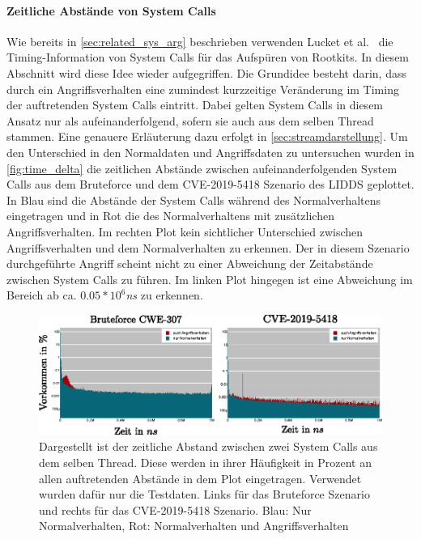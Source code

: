             \paragraph{Zeitliche Abstände von System Calls}

                Wie bereits in \autoref{sec:related_sys_arg} beschrieben verwenden Lucket et al.~\cite{TIMINGLUCKETT2016} die Timing-Information von System Calls für das Aufspüren von Rootkits.
                In diesem Abschnitt wird diese Idee wieder aufgegriffen.
                Die Grundidee besteht darin, dass durch ein Angriffsverhalten eine zumindest kurzzeitige Veränderung im Timing der auftretenden System Calls eintritt.
                Dabei gelten System Calls in diesem Ansatz nur als aufeinanderfolgend, sofern sie auch aus dem selben Thread stammen.
                Eine genauere Erläuterung dazu erfolgt in \autoref{sec:streamdarstellung}.
                Um den Unterschied in den Normaldaten und Angriffsdaten zu untersuchen wurden in \autoref{fig:time_delta} die zeitlichen Abstände zwischen aufeinanderfolgenden System Calls aus dem Bruteforce und dem CVE-2019-5418 Szenario des \ac{LIDDS} geplottet.
                In Blau sind die Abstände der System Calls während des Normalverhaltens eingetragen und in Rot die des Normalverhaltens mit zusätzlichen Angriffsverhalten.
                Im rechten Plot kein sichtlicher Unterschied zwischen Angriffsverhalten und dem Normalverhalten zu erkennen.
                Der in diesem Szenario durchgeführte Angriff scheint nicht zu einer Abweichung der Zeitabstände zwischen System Calls zu führen.
                Im linken Plot hingegen ist eine Abweichung im Bereich ab ca. $0.05*10^{6}$\textit{ns} zu erkennen.

                \begin{figure}
                    \centering
                    \includegraphics[width=\textwidth]{images/CVE-2012--Test-data-time_delta.eps}
                    \caption{Dargestellt ist der zeitliche Abstand zwischen zwei System Calls aus dem selben Thread.
                             Diese werden in ihrer Häufigkeit in Prozent an allen auftretenden Abstände in dem Plot eingetragen.
                             Verwendet wurden dafür nur die Testdaten. Links für das Bruteforce Szenario und rechts für das CVE-2019-5418 Szenario.
                             Blau: Nur Normalverhalten, Rot: Normalverhalten und Angriffsverhalten}
                    \label{fig:time_delta}
                \end{figure}

